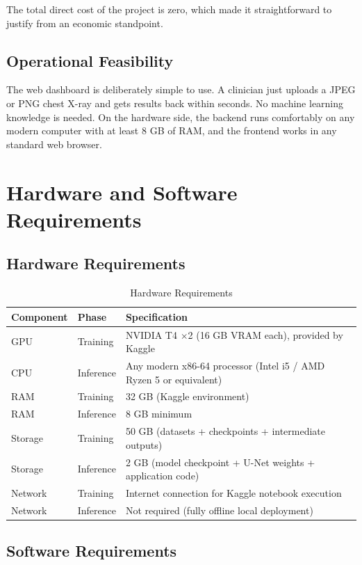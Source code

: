 \documentclass[12pt]{report}
\begin{document}
The total direct cost of the project is zero, which made it straightforward to justify from an economic standpoint.

\subsection{Operational Feasibility}
The web dashboard is deliberately simple to use. A clinician just uploads a JPEG or PNG chest X-ray and gets results back within seconds. No machine learning knowledge is needed. On the hardware side, the backend runs comfortably on any modern computer with at least 8 GB of RAM, and the frontend works in any standard web browser.

\section{Hardware and Software Requirements}

\subsection{Hardware Requirements}

\begin{table}[H]
\centering
\caption{Hardware Requirements}
\renewcommand{\arraystretch}{1.2}
\begin{tabular}{|l|l|p{6cm}|}
\hline
\textbf{Component} & \textbf{Phase} & \textbf{Specification} \\
\hline
GPU & Training & NVIDIA T4 $\times$2 (16 GB VRAM each), provided by Kaggle \\
CPU & Inference & Any modern x86-64 processor (Intel i5 / AMD Ryzen 5 or equivalent) \\
RAM & Training & 32 GB (Kaggle environment) \\
RAM & Inference & 8 GB minimum \\
Storage & Training & 50 GB (datasets + checkpoints + intermediate outputs) \\
Storage & Inference & 2 GB (model checkpoint + U-Net weights + application code) \\
Network & Training & Internet connection for Kaggle notebook execution \\
Network & Inference & Not required (fully offline local deployment) \\
\hline
\end{tabular}
\end{table}

\subsection{Software Requirements}
\end{document}
